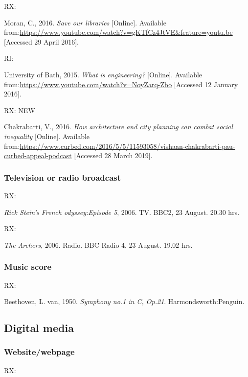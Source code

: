 RX: \cite{moran2016sol}

Moran, C., 2016. \emph{Save our libraries} [Online]. Available from:\@ \url{https://www.youtube.com/watch?v=gKTfCz4JtVE&feature=youtu.be} [Accessed 29 April 2016].


RI: \cite{uob2015wie}

University of Bath, 2015. \emph{What is engineering?} [Online]. Available from:\@ \url{https://www.youtube.com/watch?v=NoyZarq-Zbo} [Accessed 12 January 2016].


RX: \cite{chakrabarti2016hac} NEW

Chakrabarti, V., 2016. \emph{How architecture and city planning can combat social inequality} [Online]. Available from:\@ \url{https://www.curbed.com/2016/5/5/11593058/vishaan-chakrabarti-pau-curbed-appeal-podcast} [Accessed 28 March 2019].



\subsubsection*{Television or radio broadcast}

RX: \cite{rsfo2006ep5}

\emph{Rick Stein's French odyssey:\@ Episode 5}, 2006. TV. BBC2, 23 August. 20.30 hrs.


RX: \cite{archers20060823}

\emph{The Archers}, 2006. Radio. BBC Radio 4, 23 August. 19.02 hrs.



\subsubsection*{Music score}

RX: \cite{beethoven1950symph1}

Beethoven, L. van, 1950. \emph{Symphony no.1 in C, Op.21}. Harmondsworth:\@ Penguin.



\subsection{Digital media}

\subsubsection*{Website\slash webpage}

RX: \cite{holland2002gci}

